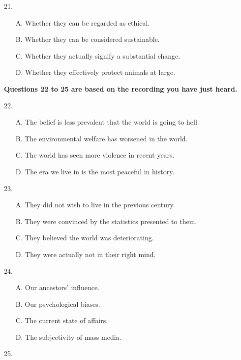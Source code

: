 \documentclass[UTF8,11pt]{ctexart}
\begin{document}
21.


\begin{itemize}[leftmargin=2em,itemsep=.2em,topsep=.4em]\item[A.] Whether they can be regarded as ethical.
\item[B.] Whether they can be considered sustainable.
\item[C.] Whether they actually signify a substantial change.
\item[D.] Whether they effectively protect animals at large.
\end{itemize}

\textbf{Questions 22 to 25 are based on the recording you have just heard.}


22.


\begin{itemize}[leftmargin=2em,itemsep=.2em,topsep=.4em]\item[A.] The belief is less prevalent that the world is going to hell.
\item[B.] The environmental welfare has worsened in the world.
\item[C.] The world has seen more violence in recent years.
\item[D.] The era we live in is the most peaceful in history.
\end{itemize}

23.


\begin{itemize}[leftmargin=2em,itemsep=.2em,topsep=.4em]\item[A.] They did not wish to live in the previous century.
\item[B.] They were convinced by the statistics presented to them.
\item[C.] They believed the world was deteriorating.
\item[D.] They were actually not in their right mind.
\end{itemize}

24.


\begin{itemize}[leftmargin=2em,itemsep=.2em,topsep=.4em]\item[A.] Our ancestors’ influence.
\item[B.] Our psychological biases.
\item[C.] The current state of affairs.
\item[D.] The subjectivity of mass media.
\end{itemize}

25.
\end{document}
